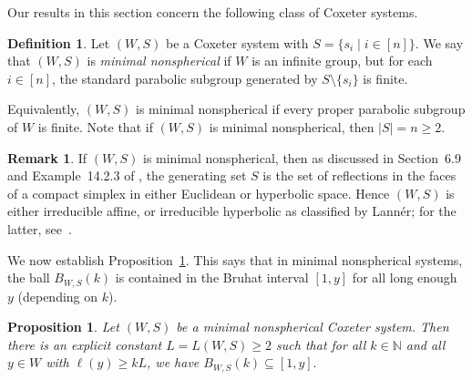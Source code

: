 \documentclass[11pt]{amsart}
\theoremstyle{plain}
\newtheorem{prop}[thm]{Proposition}
\theoremstyle{definition}
\newtheorem{definition}[thm]{Definition}
\newtheorem{rmk}[thm]{Remark}
\newcommand{\N}{\mathbb{N}}
\numberwithin{equation}{subsection}
\begin{document}
Our results in this section concern the following class of Coxeter systems.

\begin{definition} Let $(W,S)$ be a Coxeter system with $S = \{ s_i \mid i \in [n] \}$. We say that $(W,S)$ is \emph{minimal nonspherical} if $W$ is an infinite group, but for each $i \in [n]$, the standard parabolic subgroup generated by $S \setminus \{ s_i \}$ is finite.
\end{definition}

Equivalently, $(W,S)$ is minimal nonspherical if every proper parabolic subgroup of $W$ is finite. Note that if $(W,S)$ is minimal nonspherical, then $|S|=n \geq 2$. 

\begin{rmk}\label{rmk:minimal} If $(W,S)$ is minimal nonspherical, then as discussed in Section~6.9 and Example~14.2.3 of \cite{Davis}, the generating set $S$ is the set of reflections in the faces of a compact simplex in either Euclidean or hyperbolic space. Hence $(W,S)$ is either irreducible affine, or irreducible hyperbolic as classified by Lann\'er; for the latter, see~\cite[Table~6.2]{Davis}.
\end{rmk}

We now establish Proposition~\ref{prop:bruhat-volume}. This says that in minimal nonspherical systems, the ball $B_{W,S}(k)$ is  contained in the Bruhat interval $[1,y]$ for all long enough $y$ (depending on $k$). 

\begin{prop}\label{prop:bruhat-volume}
	Let $(W,S)$ be a minimal nonspherical Coxeter system. Then there is an explicit constant $L = L(W,S) \geq 2$ such that for all $k \in \N$ and all $y \in W$ with $\ell(y) \geq k L$, we have
	$
	B_{W,S}(k) \subseteq [1,y].
	$
\end{prop}
\end{document}
